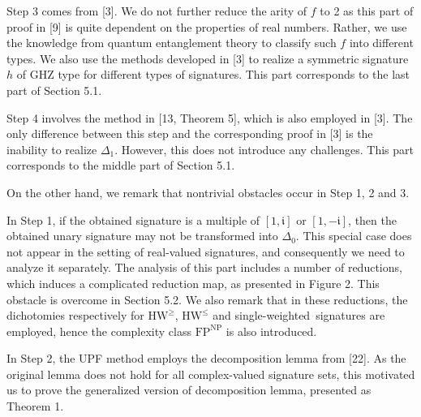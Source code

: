 \documentclass[10pt,a4paper]{article}
\begin{document}
Step 3 comes from [3]. We do not further reduce the arity of $f$ to 2 as this part of proof in [9] is quite dependent on the properties of real numbers. Rather, we use the knowledge from quantum entanglement theory to classify such $f$ into different types. We also use the methods developed in [3] to realize a symmetric signature $h$ of GHZ type for different types of signatures. This part corresponds to the last part of Section 5.1.\par




Step 4 involves the method in [13, Theorem 5], which is also employed in [3]. The only difference between this step and the corresponding proof in [3] is the inability to realize $\Delta_{1}$. However, this does not introduce any challenges. This part corresponds to the middle part of Section 5.1.\par




On the other hand, we remark that nontrivial obstacles occur in Step 1, 2 and 3.\par




In Step 1, if the obtained signature is a multiple of $[1,\mathfrak{i}]$ or $[1,-\mathfrak{i}]$, then the obtained unary signature may not be transformed into $\Delta_{0}$. This special case does not appear in the setting of real-valued signatures, and consequently we need to analyze it separately. The analysis of this part includes a number of reductions, which induces a complicated reduction map, as presented in Figure 2. This obstacle is overcome in Section 5.2. We also remark that in these reductions, the dichotomies respectively for $\text{HW}^{\geq}$, $\text{HW}^{\leq}$ and single-weighted signatures are employed, hence the complexity class $\text{FP}^{\text{NP}}$ is also introduced.\par




In Step 2, the UPF method employs the decomposition lemma from [22]. As the original lemma does not hold for all complex-valued signature sets, this motivated us to prove the generalized version of decomposition lemma, presented as Theorem 1.\par
\end{document}
